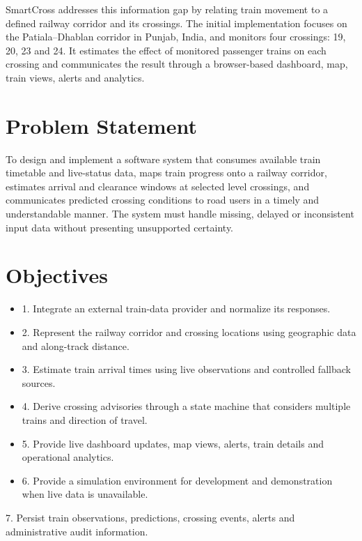 \documentclass[12pt,a4paper]{report}
\begin{document}
SmartCross addresses this information gap by relating train movement to a defined railway corridor and its crossings. The initial implementation focuses on the Patiala--Dhablan corridor in Punjab, India, and monitors four crossings: 19, 20, 23 and 24. It estimates the effect of monitored passenger trains on each crossing and communicates the result through a browser-based dashboard, map, train views, alerts and analytics.

\section{Problem Statement}
To design and implement a software system that consumes available train timetable and live-status data, maps train progress onto a railway corridor, estimates arrival and clearance windows at selected level crossings, and communicates predicted crossing conditions to road users in a timely and understandable manner. The system must handle missing, delayed or inconsistent input data without presenting unsupported certainty.

\section{Objectives}
\begin{itemize}\item 1. Integrate an external train-data provider and normalize its responses.\end{itemize}
\begin{itemize}\item 2. Represent the railway corridor and crossing locations using geographic data and along-track distance.\end{itemize}
\begin{itemize}\item 3. Estimate train arrival times using live observations and controlled fallback sources.\end{itemize}
\begin{itemize}\item 4. Derive crossing advisories through a state machine that considers multiple trains and direction of travel.\end{itemize}
\begin{itemize}\item 5. Provide live dashboard updates, map views, alerts, train details and operational analytics.\end{itemize}
\begin{itemize}\item 6. Provide a simulation environment for development and demonstration when live data is unavailable.\end{itemize}
7. Persist train observations, predictions, crossing events, alerts and administrative audit information.
\end{document}
